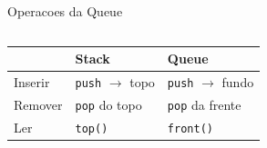 \documentclass[aspectratio=169,11pt]{beamer}
\begin{document}
\begin{frame}{Operacoes da Queue}
\begin{columns}[t]
  \end{columns}
  \vspace{0.18cm}
  \begin{tcolorbox}[caixaAzul,title={Diferenca critica: Queue vs Stack}]
    \centering\small
    \begin{tabular}{lll}
      \toprule
      & \textbf{Stack} & \textbf{Queue}\\
      \midrule
      Inserir & \texttt{push} $\to$ topo & \texttt{push} $\to$ fundo\\
      Remover & \texttt{pop} do topo & \texttt{pop} da frente\\
      Ler     & \texttt{top()} & \texttt{front()}\\
      \bottomrule
    \end{tabular}
  \end{tcolorbox}
\end{frame}
\end{document}
